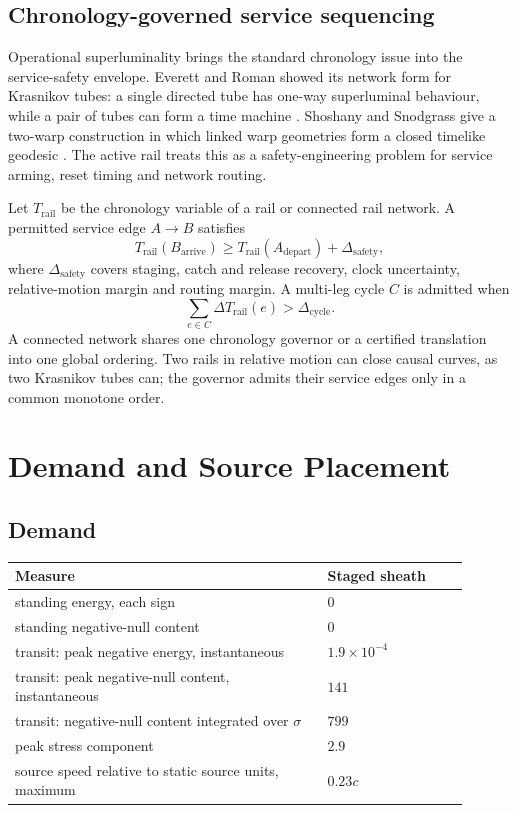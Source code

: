 \documentclass[11pt]{article}
\newcommand{\sig}{\sigma}
\begin{document}
\subsection{Chronology-governed service sequencing}

Operational superluminality brings the standard chronology issue into the service-safety envelope. Everett and Roman showed its network form for Krasnikov tubes: a single directed tube has one-way superluminal behaviour, while a pair of tubes can form a time machine \cite{EverettRoman1997}. Shoshany and Snodgrass give a two-warp construction in which linked warp geometries form a closed timelike geodesic \cite{ShoshanySnodgrass2024}. The active rail treats this as a safety-engineering problem for service arming, reset timing and network routing.

Let $T_{\mathrm{rail}}$ be the chronology variable of a rail or connected rail network. A permitted service edge $A\rightarrow B$ satisfies
\begin{equation}
T_{\mathrm{rail}}(B_{\mathrm{arrive}})\ge T_{\mathrm{rail}}(A_{\mathrm{depart}})+\Delta_{\mathrm{safety}},
\end{equation}
where $\Delta_{\mathrm{safety}}$ covers staging, catch and release recovery, clock uncertainty, relative-motion margin and routing margin. A multi-leg cycle $C$ is admitted when
\begin{equation}
\sum_{e\in C}\Delta T_{\mathrm{rail}}(e)>\Delta_{\mathrm{cycle}} .
\end{equation}
A connected network shares one chronology governor or a certified translation into one global ordering. Two rails in relative motion can close causal curves, as two Krasnikov tubes can; the governor admits their service edges only in a common monotone order.

\section{Demand and Source Placement}

\subsection{Demand}

\begin{longtable}{L{0.62\linewidth}L{0.28\linewidth}}
\toprule
\textbf{Measure} & \textbf{Staged sheath} \\
\midrule
standing energy, each sign & $0$ \\
standing negative-null content & $0$ \\
transit: peak negative energy, instantaneous & $1.9\times10^{-4}$ \\
transit: peak negative-null content, instantaneous & $141$ \\
transit: negative-null content integrated over $\sig$ & $799$ \\
peak stress component & $2.9$ \\
source speed relative to static source units, maximum & $0.23c$ \\
\bottomrule
\end{longtable}
\end{document}
